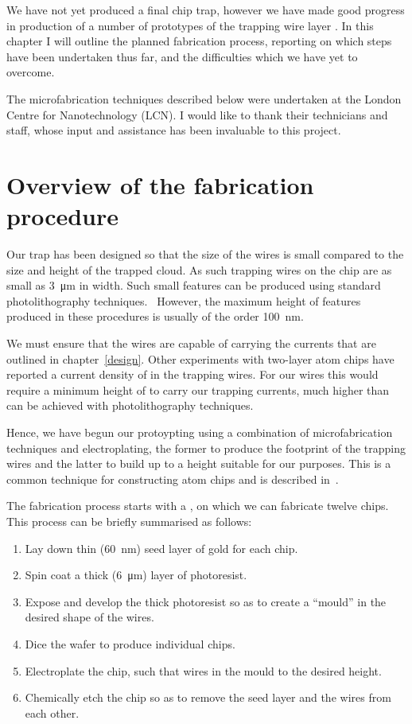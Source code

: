 We have not yet produced a final chip trap, however we have made good progress
in production of a number of prototypes of the trapping wire layer . In this chapter I will outline the
planned fabrication process, reporting on which steps have been undertaken thus
far, and the difficulties which we have yet to overcome.

The microfabrication techniques described below were undertaken at the London
Centre for Nanotechnology (LCN). I would like to thank their technicians and
staff, whose input and assistance has been invaluable to this project.

\section{Overview of the fabrication procedure}

Our trap has been designed so that the size of the wires is small compared to
the size and height of the trapped cloud. As such trapping wires on the chip
are as small as \SI{3}{\micro\meter} in width. Such small features can be
produced using standard photolithography techniques.~\cite{Madou2002} However,
the maximum height of features produced in these procedures is usually of the
order \SI{100}{\nano\meter}.

We must ensure that the wires are capable of carrying the currents that are
outlined in chapter~\ref{design}.  Other experiments with two-layer atom chips
have reported a current density of  in the trapping wires. For our wires
this would require a minimum height of  to carry our trapping
currents, much higher than can be achieved with photolithography techniques.

Hence, we have begun our protoypting using a combination of microfabrication
techniques and electroplating, the former to produce the footprint of the
trapping wires and the latter to build up to a height suitable for our
purposes. This is a common technique for constructing atom chips and is
described in~\cite{2011Ac, Lev2003}.

The fabrication process starts with a ,
on which we can fabricate twelve  chips. This process can be
briefly summarised as follows:
\begin{enumerate}
\item Lay down thin (\SI{60}{\nano\meter}) seed layer of gold for each chip.
\item Spin coat a thick (\SI{6}{\micro\meter}) layer of photoresist.
\item Expose and develop the thick photoresist so as to create a ``mould''
in the desired shape of the wires.
\item Dice the wafer to produce individual chips.
\item Electroplate the chip, such that wires  in the mould to the
desired height.
\item Chemically etch the chip so as to remove the seed layer and
   the wires from each other.
\end{enumerate}

